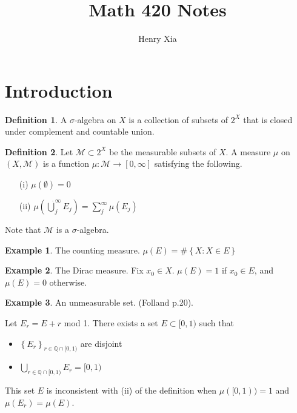 \documentclass[11pt]{article}
\title{Math 420 Notes}
\author{Henry Xia}
\theoremstyle{definition}
\newtheorem{defn}{Definition}[section]
\newtheorem{example}{Example}[section]
\newcommand{\set}[1]{\left\{ #1 \right\}}
\newcommand{\QQ}{\mathbb{Q}}
\newcommand{\m}[1]{\mathcal{#1}}
\begin{document}
\maketitle

\tableofcontents


\section{Introduction}

\begin{defn}
    A $\sigma$-algebra on $X$ is a collection of subsets of $2^X$ that is closed
    under complement and countable union.
\end{defn}

\begin{defn}
    Let $\m{M}\subset 2^X$ be the measurable subsets of $X$. A measure $\mu$ on
    $(X,\m{M})$ is a function $\mu:\m{M}\to[0,\infty]$ satisfying the following.
    \begin{enumerate}
        \item[(i)] $\mu(\emptyset) = 0$
        \item[(ii)] $\mu(\dot\bigcup_j^\infty E_j) = \sum_j^\infty \mu(E_j)$
    \end{enumerate}
    Note that $\m{M}$ is a $\sigma$-algebra.
\end{defn}

\begin{example}
    The counting measure. $\mu(E) = \#\set{X:X\in E}$
\end{example}
\begin{example}
    The Dirac measure. Fix $x_0\in X$. $\mu(E) = 1$ if $x_0\in E$, and $\mu(E) =
0$ otherwise.  \end{example}
\begin{example}
    An unmeasurable set. (Folland p.20).

    Let $E_r = E+r$ mod 1. There exists a set $E\subset[0,1)$ such that 
    \begin{itemize}
        \item $\set{E_r}_{r\in\QQ\cap[0,1)}$ are disjoint
        \item $\bigcup_{r\in\QQ\cap[0,1)} E_r = [0,1)$
    \end{itemize}
    This set $E$ is inconsistent with (ii) of the definition when $\mu([0,1)) =
    1$ and $\mu(E_r) = \mu(E)$.
\end{example}
\end{document}
